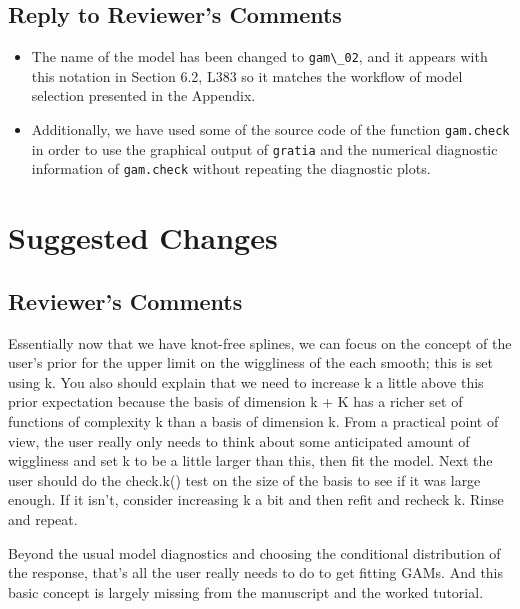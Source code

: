 \documentclass[
]{article}
\newcommand{\passthrough}[1]{#1}
\providecommand{\tightlist}{%
  \setlength{\itemsep}{0pt}\setlength{\parskip}{0pt}}
\begin{document}
\hypertarget{section-9}{%
\subsection{\texorpdfstring{\textcolor{reviewersblue} {Reply to Reviewer's Comments}}{}}\label{section-9}}

\begin{itemize}
\tightlist
\item
  The name of the model has been changed to \passthrough{\lstinline!gam\_02!}, and it appears with this notation in Section 6.2, L383 so it matches the workflow of model selection presented in the Appendix.
\item
  Additionally, we have used some of the source code of the function \passthrough{\lstinline!gam.check!} in order to use the graphical output of \passthrough{\lstinline!gratia!} and the numerical diagnostic information of \passthrough{\lstinline!gam.check!} without repeating the diagnostic plots.
\end{itemize}

\hypertarget{suggested-changes}{%
\section{Suggested Changes}\label{suggested-changes}}

\hypertarget{reviewers-comments-10}{%
\subsection{Reviewer's Comments}\label{reviewers-comments-10}}

Essentially now that we have knot-free splines, we can focus on the concept of the user's prior for the upper limit on the wiggliness of the each smooth; this is set using k. You also should explain that we need to increase k a little above this prior expectation because the basis of dimension k + K has a richer set of functions of complexity k than a basis of dimension k. From a practical point of view, the user really only needs to think about some anticipated amount of wiggliness and set k to be a little larger than this, then fit the model.
Next the user should do the check.k() test on the size of the basis to see if it was large enough. If it isn't, consider increasing k a bit and then refit and recheck k. Rinse and repeat.

Beyond the usual model diagnostics and choosing the conditional distribution of the response, that's all the user really needs to do to get fitting GAMs. And this basic concept is largely missing from the manuscript and the worked tutorial.
\end{document}
